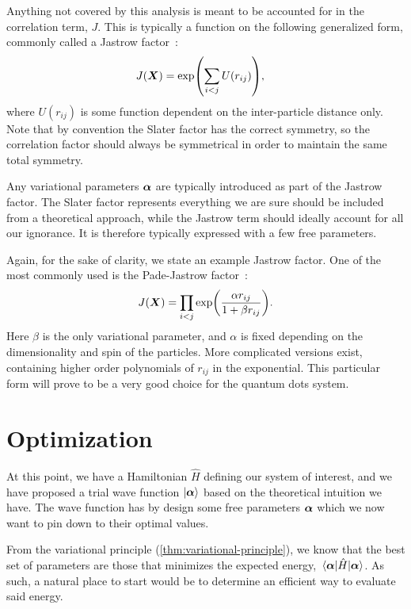 \documentclass[Thesis.tex]{subfiles}
\begin{document}
Anything not covered by this analysis is meant to be accounted for in the correlation
term, $J$. This is typically a function on the following generalized form, commonly called a Jastrow
factor~\cite{Jastrow-1955}:
\begin{align}
    J(\bm{X}) &= \exp(\sum_{i < j} U(r_{ij})),
\end{align}
where $U(r_{ij})$ is some function dependent on the inter-particle distance only. Note that by
convention the Slater factor has the correct symmetry, so the correlation factor should
always be symmetrical in order to maintain the same total symmetry.

Any variational parameters $\bm{\alpha}$ are typically introduced as part of the Jastrow
factor. The Slater factor represents everything we are sure should be included
from a theoretical approach, while the Jastrow term should ideally account for all our ignorance.
It is therefore typically expressed with a few free parameters.

Again, for the sake of clarity, we state an example Jastrow factor. One of the most
commonly used is the Pade-Jastrow factor~\cite{Drummond-Towler-Needs-2008}:
\begin{align}
    J(\bm{X}) = \prod_{i < j} \exp(\frac{\alpha r_{ij}}{1 + \beta r_{ij} } ).
\end{align}
Here $\beta$ is the only variational parameter, and $\alpha$ is fixed depending on the
dimensionality and spin of the particles. More complicated versions exist, containing
higher order polynomials of $r_{ij}$ in the exponential. This particular form
will prove to be a very good choice for the quantum dots system.




\section{Optimization}

At this point, we have a Hamiltonian $\hat H$ defining our system of interest,
and we have proposed a trial wave function $| \bm{\alpha} \rangle$ based on the
theoretical intuition we have. The wave function has by design some free
parameters $\bm{\alpha}$ which we now want to pin down to their optimal values.

From the variational principle (\cref{thm:variational-principle}), we know
that the best set of parameters are those that minimizes the expected energy,
$\expval{\hat H}{\bm{\alpha}}$. As such, a natural place to start would be to
determine an efficient way to evaluate said energy.
\end{document}
